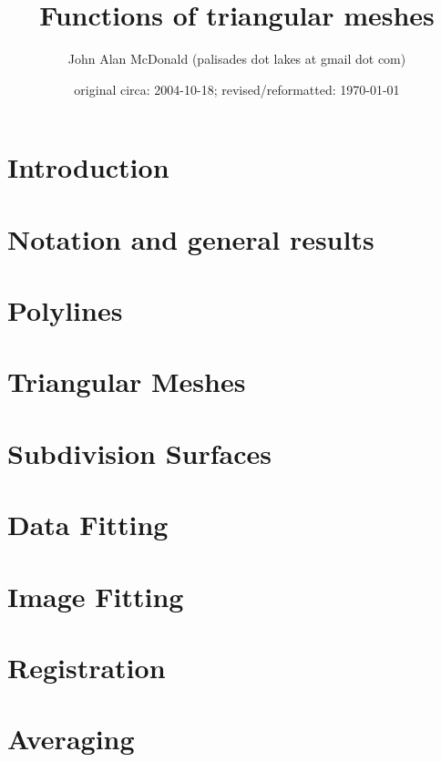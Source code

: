 \documentclass{PalisadesLakesReport}
\title{Functions of triangular meshes}
\author{John Alan McDonald (palisades dot lakes at gmail dot com)}
\date{original circa: 2004-10-18; revised/reformatted: \today}
\begin{document}
\maketitle
\PalisadesLakesTableOfContents
\def\sharedFolder{../../shared/}



\section{Introduction}


\section{Notation and general results}



\section{Polylines}


\section{Triangular Meshes}




\section{Subdivision Surfaces}



\section{Data Fitting}


\section{Image Fitting}


\section{Registration}


\section{Averaging}


\end{document}
